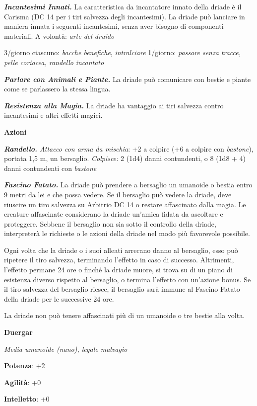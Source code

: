 \begin{multicols}{2}
\emph{\textbf{Incantesimi Innati.}} La caratteristica da incantatore
innato della driade è il Carisma (DC 14 per i tiri salvezza degli
incantesimi). La driade può lanciare in maniera innata i seguenti
incantesimi, senza aver bisogno di componenti materiali. A volontà:
\emph{arte del druido}

3/giorno ciascuno: \emph{bacche benefiche}, \emph{intralciare} 1/giorno:
\emph{passare senza tracce, pelle coriacea, randello} \emph{incantato}

\emph{\textbf{Parlare con Animali e Piante.}} La driade può comunicare
con bestie e piante come se parlassero la stessa lingua.

\emph{\textbf{Resistenza alla Magia.}} La driade ha vantaggio ai tiri
salvezza contro incantesimi e altri effetti magici.

\textbf{Azioni}

\emph{\textbf{Randello.} Attacco con arma da mischia}: +2 a colpire (+6
a colpire con \emph{bastone}), portata 1,5 m, un bersaglio.
\emph{Colpisce:} 2 (1d4) danni contundenti, o 8 (1d8 + 4) danni
contundenti con \emph{bastone}

\emph{\textbf{Fascino Fatato.}} La driade può prendere a bersaglio un
umanoide o bestia entro 9 metri da lei e che possa vedere. Se il
bersaglio può vedere la driade, deve riuscire un tiro salvezza su Arbitrio DC 14 o restare affascinato dalla magia. Le creature
affascinate considerano la driade un'amica fidata da ascoltare e
proteggere. Sebbene il bersaglio non sia sotto il controllo della
driade, interpreterà le richieste o le azioni della driade nel modo più
favorevole possibile.

Ogni volta che la driade o i suoi alleati arrecano danno al bersaglio,
esso può ripetere il tiro salvezza, terminando l'effetto in caso di
successo. Altrimenti, l'effetto permane 24 ore o finché la driade muore,
si trova su di un piano di esistenza diverso rispetto al bersaglio, o
termina l'effetto con un'azione bonus. Se il tiro salvezza del bersaglio
riesce, il bersaglio sarà immune al Fascino Fatato della driade per le
successive 24 ore.

La driade non può tenere affascinati più di un umanoide o tre bestie
alla volta.

\textbf{Duergar}

\emph{Media umanoide (nano), legale malvagio}

\textbf{Potenza}: +2

\textbf{Agilità}: +0

\textbf{Intelletto}: +0


\end{multicols}
